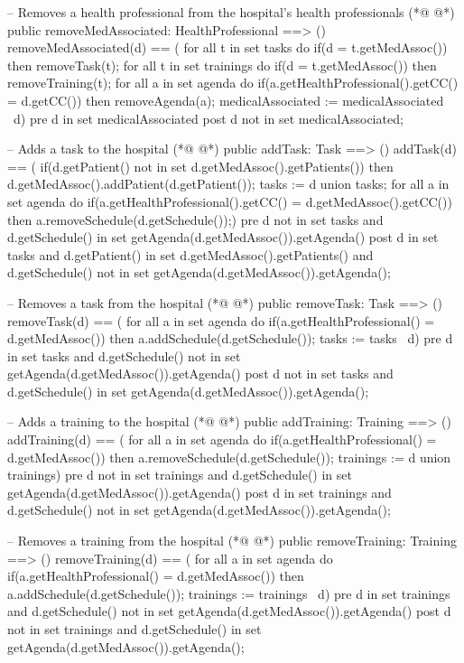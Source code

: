 \begin{vdmpp}[breaklines=true]
 -- Removes a health professional from the hospital's health professionals
(*@
\label{removeMedAssociated:68}
@*)
 public removeMedAssociated: HealthProfessional ==> ()
  removeMedAssociated(d) == (
   for all t in set tasks do
    if(d = t.getMedAssoc())
     then removeTask(t);
   for all t in set trainings do
    if(d = t.getMedAssoc())
     then removeTraining(t);
   for all a in set agenda do
    if(a.getHealthProfessional().getCC() = d.getCC())
     then removeAgenda(a);
   medicalAssociated := medicalAssociated \ {d})
 pre d in set medicalAssociated
 post d not in set medicalAssociated;
 
 -- Adds a task to the hospital
(*@
\label{addTask:84}
@*)
 public addTask: Task ==> ()
  addTask(d) == (
   if(d.getPatient() not in set d.getMedAssoc().getPatients())
    then d.getMedAssoc().addPatient(d.getPatient());
   tasks := {d} union tasks;
   for all a in set agenda do
    if(a.getHealthProfessional().getCC() = d.getMedAssoc().getCC())
      then a.removeSchedule(d.getSchedule());)
 pre d not in set tasks and d.getSchedule() in set getAgenda(d.getMedAssoc()).getAgenda()
 post d in set tasks and d.getPatient() in set d.getMedAssoc().getPatients() and d.getSchedule() not in set getAgenda(d.getMedAssoc()).getAgenda();
  
 -- Removes a task from the hospital
(*@
\label{removeTask:96}
@*)
 public removeTask: Task ==> ()
  removeTask(d) == (
   for all a in set agenda do
    if(a.getHealthProfessional() = d.getMedAssoc())
      then a.addSchedule(d.getSchedule());
   tasks := tasks \ {d})
 pre d in set tasks and d.getSchedule() not in set getAgenda(d.getMedAssoc()).getAgenda()
 post d not in set tasks and d.getSchedule() in set getAgenda(d.getMedAssoc()).getAgenda();
 
 -- Adds a training to the hospital
(*@
\label{addTraining:106}
@*)
 public addTraining: Training ==> ()
  addTraining(d) == (
   for all a in set agenda do
    if(a.getHealthProfessional() = d.getMedAssoc())
      then a.removeSchedule(d.getSchedule());
   trainings := {d} union trainings)
 pre d not in set trainings and d.getSchedule() in set getAgenda(d.getMedAssoc()).getAgenda()
 post d in set trainings and d.getSchedule() not in set getAgenda(d.getMedAssoc()).getAgenda();
 
 -- Removes a training from the hospital
(*@
\label{removeTraining:116}
@*)
 public removeTraining: Training ==> ()
  removeTraining(d) == (
   for all a in set agenda do
    if(a.getHealthProfessional() = d.getMedAssoc())
      then a.addSchedule(d.getSchedule());
   trainings := trainings \ {d})
 pre d in set trainings and d.getSchedule() not in set getAgenda(d.getMedAssoc()).getAgenda()
 post d not in set trainings and d.getSchedule() in set getAgenda(d.getMedAssoc()).getAgenda();
 

\end{vdmpp}
